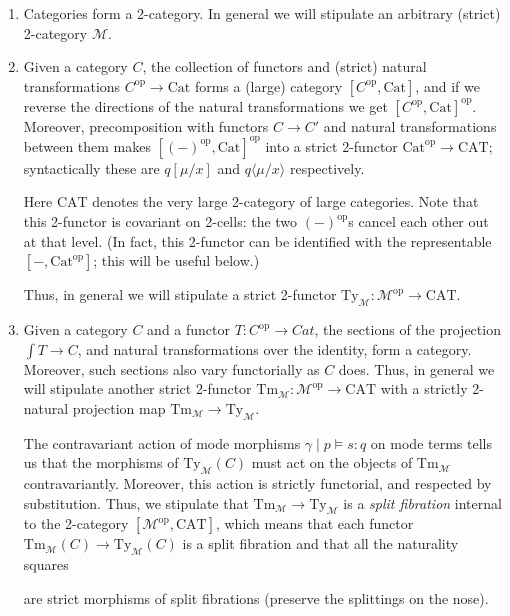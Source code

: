 \documentclass[10pt]{article}
\theoremstyle{definition}
\newcommand\TypeTwo[4]{\ensuremath{#1 \mid #3 \vDash #2 : #4}}
\newcommand\ap[2]{\ensuremath{#1 \langle #2 \rangle }}
\newcommand\op{^{\mathrm{op}}}
\newcommand\Cat{\mathrm{Cat}}
\newcommand\CAT{\mathrm{CAT}}
\newcommand\M{\mathcal{M}}
\newcommand\Mty{{\mathrm{Ty}_{\M}}}
\newcommand\Mtm{{\mathrm{Tm}_{\M}}}
\begin{document}
\begin{enumerate}
\item Categories form a 2-category.
  In general we will stipulate an arbitrary (strict) 2-category $\M$.
\item Given a category $C$, the collection of functors and (strict) natural transformations $C\op \to \Cat$ forms a (large) category $[C\op, \Cat]$, and if we reverse the directions of the natural transformations we get $[C\op, \Cat]\op$.
  Moreover, precomposition with functors $C\to C'$ and natural transformations between them makes $[(-)\op, \Cat]\op$ into a strict 2-functor $\Cat\op \to \CAT$; syntactically these are $q[\mu/x]$ and $\ap{q}{\mu/x}$ respectively.

  Here $\CAT$ denotes the very large 2-category of large categories.
  Note that this 2-functor is covariant on 2-cells: the two $(-)\op$s cancel each other out at that level.
  (In fact, this 2-functor can be identified with the representable $[-,\Cat\op]$; this will be useful below.)

  Thus, in general we will stipulate a strict 2-functor $\Mty:\M\op \to \CAT$.
  \addtocounter{enumi}{1}
\item Given a category $C$ and a functor $T:C\op\to Cat$, the sections of the projection $\int T \to C$, and natural transformations over the identity, form a category.
  Moreover, such sections also vary functorially as $C$ does.
  Thus, in general we will stipulate another strict 2-functor $\Mtm : \M\op\to\CAT$ with a strictly 2-natural projection map $\Mtm\to\Mty$.

  The contravariant action of mode morphisms $\TypeTwo{\gamma}{s}{p}{q}$ on mode terms tells us that the morphisms of $\Mty(C)$ must act on the objects of $\Mtm$ contravariantly.
  Moreover, this action is strictly functorial, and respected by substitution.
  Thus, we stipulate that $\Mtm \to \Mty$ is a \emph{split fibration} internal to the 2-category $[\M\op,\CAT]$, which means that each functor $\Mtm(C) \to \Mty(C)$ is a split fibration and that all the naturality squares
  \begin{center}
  \end{center}
  are strict morphisms of split fibrations (preserve the splittings on the nose).


\end{enumerate}
\end{document}
